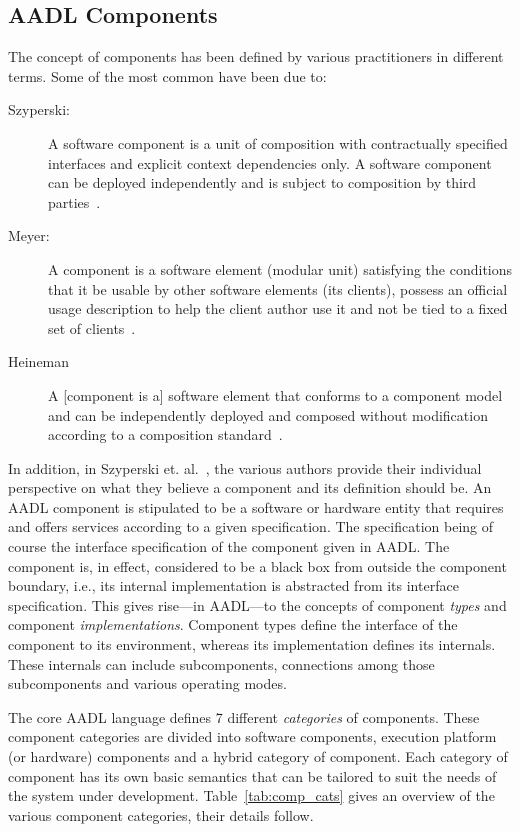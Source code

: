 \subsection{AADL Components}
The concept of components has been defined by various practitioners in
different terms. Some of the most common have been due to:
\begin{description}
\item[Szyperski:]{A software component is a unit of composition with
  contractually specified interfaces and explicit context dependencies
  only. A software component can be deployed independently and is
  subject to composition by third parties~\cite{szyperski-cs}.}
\item[Meyer:]{A component is a software element (modular unit)
  satisfying the conditions that it be usable by other software
  elements (its clients), possess an official usage description to
  help the client author use it and not be tied to a fixed set of
  clients~\cite{meyer@icse03}.}
\item[Heineman]{A [component is a] software element that conforms to a
  component model and can be independently deployed and composed
  without modification according to a composition
  standard~\cite{heineman-components}.}
\end{description}

In addition, in Szyperski et. al.~\cite{szyperski@sct04}, the various
authors provide their individual perspective on what they believe a
component and its definition should be. An AADL component is
stipulated to be a software or hardware entity that requires and
offers services according to a given specification. The specification
being of course the interface specification of the component given in
AADL. The component is, in effect, considered to be a black box from
outside the component boundary, i.e., its internal implementation is
abstracted from its interface specification. This gives rise---in
AADL---to the concepts of component \emph{types} and component
\emph{implementations}. Component types define the interface of the
component to its environment, whereas its implementation defines its
internals. These internals can include subcomponents, connections
among those subcomponents and various operating modes.

The core AADL language defines 7 different \emph{categories} of
components. These component categories are divided into software
components, execution platform (or hardware) components and a hybrid
category of component. Each category of component has its own basic
semantics that can be tailored to suit the needs of the system under
development. Table~\ref{tab:comp_cats} gives an overview of the
various component categories, their details follow.


